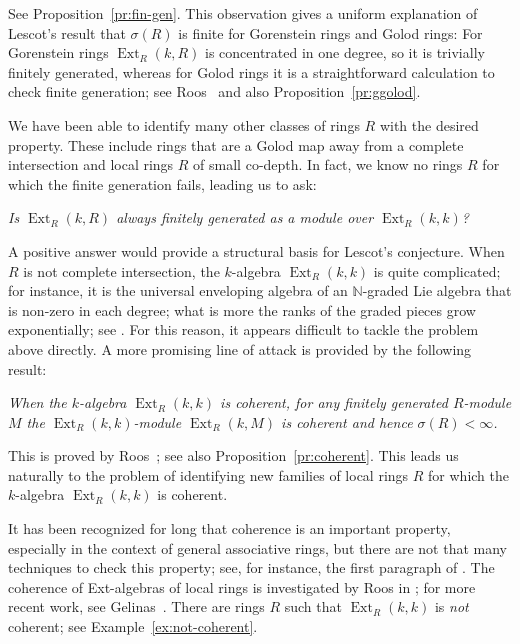 \documentclass{amsart}
\numberwithin{equation}{section}
\theoremstyle{plain}
\theoremstyle{definition}
\theoremstyle{remark}
\newcommand{\bbN}{\mathbb{N}}
\newcommand{\ext}{\operatorname{Ext}}
\begin{document}
\medskip

See Proposition~\ref{pr:fin-gen}. This observation gives a uniform explanation of Lescot's result that $\sigma(R)$ is finite for Gorenstein rings and Golod rings: For Gorenstein rings $\ext_R(k,R)$ is concentrated in one degree, so it is trivially finitely generated, whereas for Golod rings it is a straightforward calculation to check finite generation; see Roos~\cite{Roos:1978s} and also Proposition~\ref{pr:ggolod}. 

We have been able to identify many other classes of rings $R$ with the desired property. These include rings that are a Golod map away from a complete intersection and local rings $R$ of small co-depth. In fact, we know no rings $R$ for which the finite generation fails, leading us to ask:

\medskip

\emph{
Is $\ext_R(k,R)$ always finitely generated as a module over $\ext_R(k,k)$?
}

\medskip

A positive answer would provide a structural basis for Lescot's conjecture. When $R$ is not complete intersection, the $k$-algebra $\ext_R(k,k)$ is quite complicated; for instance, it is the universal enveloping algebra of an $\bbN$-graded Lie algebra that is non-zero in each degree; what is more the ranks of the graded pieces grow exponentially; see \cite{Avramov:1998a}. For this reason, it appears difficult to tackle the problem above directly. A more promising line of attack is provided by the following result:

\medskip

\emph{
When the $k$-algebra $\ext_R(k,k)$ is coherent, for any finitely generated $R$-module $M$ the $\ext_R(k,k)$-module $\ext_R(k,M)$ is coherent and hence $\sigma(R)<\infty$.
}

\medskip

This is proved by Roos~\cite{Roos:1978s}; see also Proposition~\ref{pr:coherent}. This leads us naturally to the problem of identifying new families of local rings $R$ for which the $k$-algebra $\ext_R(k,k)$ is coherent.

It has been recognized for long that coherence is an important property, especially in the context of general associative rings, but there are not that many techniques to check this property; see, for instance, the first paragraph of \cite{Bonda/Zhdanovskiy:2015}. The coherence of Ext-algebras of local rings is investigated by Roos in \cite{Roos:1982a}; for more recent work, see Gelinas~\cite{Gelinas:2018}.  There are rings $R$ such that $\ext_R(k,k)$ is \emph{not} coherent; see Example~\ref{ex:not-coherent}. 
\end{document}
